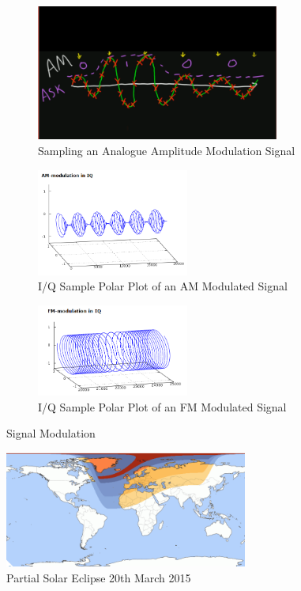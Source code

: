 \documentclass[runningheads,a4paper]{llncs}
\begin{document}
%
\begin{figure}	
	\centering
	\begin{subfigure}[t]{8cm}
		\centering
		\includegraphics[width=8cm]{images/46}
		\caption{Sampling an Analogue Amplitude Modulation Signal \citep{ossmann-15-c}}\label{fig:ossmann_am_demodulation}		
	\end{subfigure}
	\quad
	\begin{subfigure}[t]{5cm}
		\centering
		\includegraphics[width=5cm]{images/49}
		\caption{I/Q Sample Polar Plot of an AM Modulated Signal \citep{kuisma-14}}\label{fig:kuisma-iq-am-helix}
	\end{subfigure}
	\quad
	\begin{subfigure}[t]{5cm}
		\centering
		\includegraphics[width=5cm]{images/50}
		\caption{I/Q Sample Polar Plot of an FM Modulated Signal \citep{kuisma-14}}\label{fig:kuisma-iq-fm-helix}
	\end{subfigure}
	\caption{Signal Modulation}\label{fig:signal_modulation}
\end{figure}
%

%
\begin{figure}[here]
	\centering
	\includegraphics[width=8cm]{images/41}
	\caption{Partial Solar Eclipse 20th March 2015 \citep{eclipse-15}}
	\label{fig:solar_eclipse_scale}
\end{figure}
%


%


%
\end{document}
